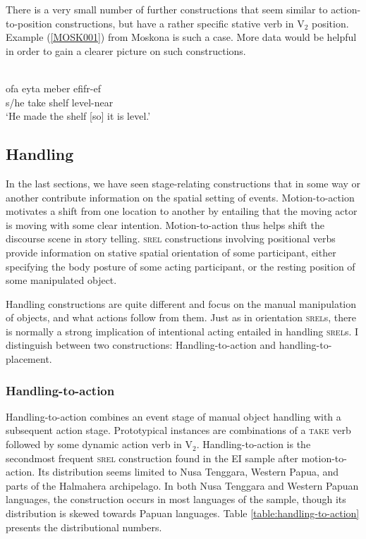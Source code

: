 There is a very small number of further constructions that seem similar to action-to-position constructions, but have a rather specific stative verb in V$_2$ position. Example (\ref{MOSK001}) from Moskona is such a case. More data would be helpful in order to gain a clearer picture on such constructions.

\ea \label{MOSK001}
\\
\gll ofa eyta meber efifr-ef \\
s/he take shelf level-near \\
\glft ‘He made the shelf [so] it is level.’\\ 
\z

\subsection{Handling}

In the last sections, we have seen stage-relating constructions that in some way or another contribute information on the spatial setting of events. Motion-to-action motivates a shift from one location to another by entailing that the moving actor is moving with some clear intention. Motion-to-action thus helps shift the discourse scene in story telling. \textsc{srel} constructions involving positional verbs provide information on stative spatial orientation of some participant, either specifying the body posture of some acting participant, or the resting position of some manipulated object. 

Handling constructions are quite different and focus on the manual manipulation of objects, and what actions follow from them. Just as in orientation \textsc{srel}s, there is normally a strong implication of intentional acting entailed in handling \textsc{srel}s. I distinguish between two constructions: Handling-to-action and handling-to-placement. 

\subsubsection{Handling-to-action} \label{sec:handling-to-action}

Handling-to-action combines an event stage of manual object handling with a subsequent action stage. Prototypical instances are combinations of a \textsc{take} verb followed by some dynamic action verb in V$_2$. Handling-to-action is the secondmost frequent \textsc{srel} construction found in the EI sample after motion-to-action. Its distribution seems limited to Nusa Tenggara, Western Papua, and parts of the Halmahera archipelago. In both Nusa Tenggara and Western Papuan languages, the construction occurs in most languages of the sample, though its distribution is skewed towards Papuan languages. Table \ref{table:handling-to-action} presents the distributional numbers.

